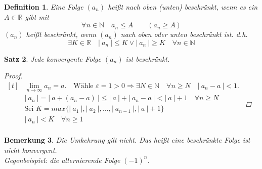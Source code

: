 \documentclass[a4paper,titlepage,oneside]{article}
\def\N{\ensuremath{\mathbb{N}} }
\def\R{\ensuremath{\mathbb{R}} }
\renewcommand{\epsilon}{\ensuremath{\varepsilon}}
\def\lor{\ensuremath{\vee}}
\renewcommand{\liminf}[2][n]{\ensuremath{\lim\limits_{#1 \rightarrow \infty}{#2}}}
\newcommand{\abs}[1]{\ensuremath{\left|\:#1\:\right|}}
\theoremstyle{thmstyle}
\newtheorem{satz}{Satz}[subsection]
\newtheorem{defi}[satz]{Definition}
\newtheorem{bem}[satz]{Bemerkung}
\begin{document}
\begin{defi}
Eine Folge \((a_n)\) heißt nach oben (unten) beschränkt, wenn es ein \(A \in \R\) gibt mit \[\forall n \in \N \quad a_n \le A \qquad (a_n \ge A)\]
\((a_n)\) heißt beschränkt, wenn \((a_n)\) nach oben oder unten beschränkt ist. d.h. \[\exists K \in \R \quad \abs{a_n} \le K \lor \abs{a_n} \ge K \quad \forall n \in \N \]
\end{defi}

\begin{satz}
Jede konvergente Folge \((a_n)\) ist beschränkt.
\begin{proof}
\begin{math} \displaystyle
\begin{aligned}[t]
	&\liminf{a_n} = a. \quad \text{Wähle } \epsilon = 1 > 0 \Rightarrow \exists N \in \N \quad \forall n \ge N \quad \abs{a_n - a} < 1. \\
	&\abs{a_n} = \abs{a + (a_n - a)} \le \abs{a} + \abs{a_n- a} < \abs{a} + 1 \quad \forall n \ge N \\
	&\text{Sei } K = max\{\abs{a_1}, \abs{a_2}, \dots, \abs{a_{n-1}}, \abs{a}+1\} \\
	&\abs{a_n} < K \quad \forall n \ge 1 \\
\end{aligned}
\end{math}
\end{proof}
\end{satz}

\begin{bem}
Die Umkehrung gilt nicht. Das heißt eine beschränkte Folge ist nicht konvergent.\\
\textit{Gegenbeispiel}: die alternierende Folge $(-1)^n$.
\end{bem}
\end{document}
